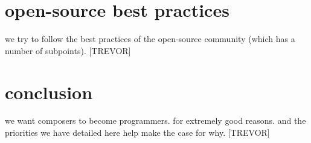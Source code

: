 \documentclass{article}
\begin{document}
\section{open-source best practices}
we try to follow the best practices of the open-source community (which has
a number of subpoints). [TREVOR]

\section{conclusion}
we want composers to become programmers. for extremely good
reasons. and the priorities we have detailed here help make the case for why.
[TREVOR]


\end{document}

